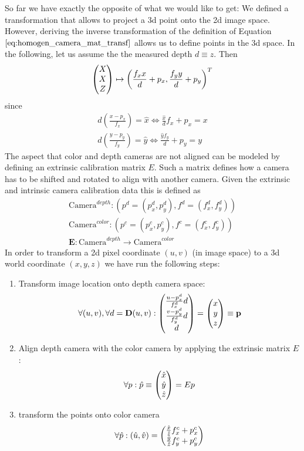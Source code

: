 So far we have exactly the opposite of what we would like to get: We defined a transformation that allows to project a 3d point onto the 2d image space. However, deriving the inverse transformation of the definition of Equation $\ref{eq:homogen_camera_mat_transf}$ allows us to define points in the 3d space. In the following, let us assume the the measured depth $d \equiv z$. Then
\begin{equation}
	\colvec[X]{X}{Z} \mapsto \left( \frac{f_x x}{d} + p_x, \frac{f_y y}{d} + p_y \right)^T
\end{equation}
since
\begin{equation}
\begin{aligned}
	d \left( \frac{x - p_x}{f_x} \right) = \hat{x} \Leftrightarrow \frac{\hat{x}}{d} f_x + p_x = x \\
	d \left( \frac{y - p_y}{f_y} \right) = \hat{y} \Leftrightarrow \frac{\hat{y} f_y}{d} + p_y = y 
\end{aligned}
\label{eq:depth_tranfomation}
\end{equation}
The aspect that color and depth cameras are not aligned can be modeled by defining an extrinsic calibration matrix $E$. Such a matrix defines how a camera has to be shifted and rotated to align with another camera. Given the extrinsic and intrinsic camera calibration data this is defined as
\begin{equation}
\begin{aligned}
	\text{Camera}^{depth} : \left( p^d = (p_x^d, p_y^d), f^d = (f_x^d, f_y^d)\right) \\
	\text{Camera}^{color} : \left( p^c = (p_x^c, p_y^c), f^c = (f_x^c, f_y^c)\right) \\
	\textbf{E} : \text{Camera}^{depth} \rightarrow \text{Camera}^{color}
\end{aligned}
\label{eq:calib_data}
\end{equation}
In order to transform a 2d pixel coordinate $\left( u, v \right)$ (in image space) to a 3d world coordinate $\left( x, y, z \right)$ we have run the following steps:
\begin{enumerate}
\item Transform image location onto depth camera space:
\begin{equation}
	\forall (u, v), \forall d = \textbf{D}(u,v): \colvec[\frac{u - p_x^d}{f_x^d} d]{\frac{v - p_y^d}{f_y^d} d}{d} = \colvec[x]{y}{z} \equiv \bf{p}
\end{equation}
\item Align depth camera with the color camera by applying the extrinsic matrix $E$:
\begin{equation}
	\forall p: \hat{p} \equiv \colvec[\hat{x}]{\hat{y}}{\hat{z}} =  E p
\end{equation}
\item transform the points onto color camera
\begin{equation}
	\forall \hat{p} : \left( \hat{u}, \hat{v}\right) = \colvec{\frac{\hat{x}}{\hat{z}} f_x^c + p_x^c}{\frac{\hat{y}}{\hat{z}} f_y^c + p_y^c}
\end{equation}
\end{enumerate}

